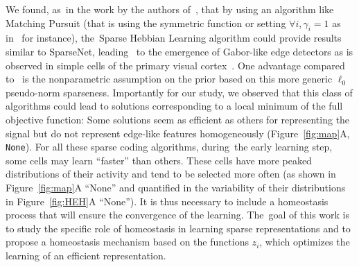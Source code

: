 \documentclass[vision,article,accept,oneauthor,pdftex]{Definitions/mdpi}
\newcommand{\seeFig}[1]{Figure~\ref{fig:#1}}%
\begin{document}
We found, as~in the work by the authors of~\citep{Rehn07}, that by using an algorithm like Matching Pursuit (that is using the symmetric function or setting $\forall i, \gamma_i=1$ as in~\citep{Mairal14} for instance), the~Sparse Hebbian Learning algorithm could provide results similar to {\sc SparseNet}, leading~ to the emergence of Gabor-like edge detectors as is observed in simple cells of the primary visual cortex~\citep{Fischer07}. One advantage compared to~\citep{Olshausen97} is the nonparametric assumption on the prior based on this more generic $\ell_0$ pseudo-norm sparseness. Importantly for our study, we observed that this class of algorithms could lead to solutions corresponding to a local minimum of the full objective function: Some solutions seem as efficient as others for representing the signal but do not represent edge-like features homogeneously (\seeFig{map}A, \texttt{None}). %
For all these sparse coding algorithms, during~the early learning step, some cells may learn ``faster'' than others. These cells have more peaked distributions of their activity and tend to be selected more often (as shown in Figure~\ref{fig:map}A ``None'' and quantified in the variability of their distributions in Figure~\ref{fig:HEH}A ``None''). It is thus necessary to include a homeostasis process that will ensure the convergence of the learning. The~goal of this work is to study the specific role of homeostasis in learning sparse representations and to propose a homeostasis mechanism based on the functions $z_i$, which optimizes the learning of an efficient representation.%
\end{document}

